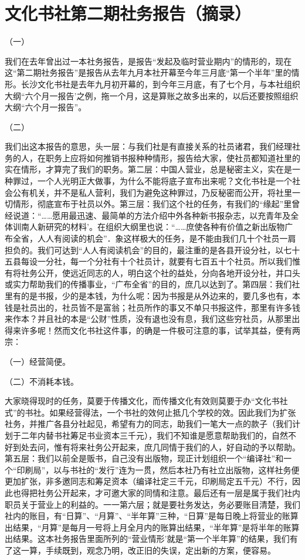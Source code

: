 \section{文化书社第二期社务报告（摘录）}



（一）

我们在去年曾出过一本社务报告，是报告“发起及临时营业期内”的情形的，现在这“第二期社务报告”是报告从去年九月本社开幕至今年三月底“第一个半年”里的情形。长沙文化书社是去年九月初开幕的，到今年三月底，有了七个月，与本社组织大纲“六个月一报告’之例，拖一个月，这是算账之故多出来的，以后还要按照组织大纲“六个月一报告”。

（二）

我们出这本报告的意思，头一层：与我们社是有直接关系的社员诸君，我们经理社务的人，在职务上应将如何推销书报种种情形，报告给大家，使社员都知道社里的实在情形，才算完了我们的职务。第二层：中国人营业，总是秘密主义，实在是一种罪过，一个人光明正大做事，为什么不能将底子宣布出来呢？文化书社是一个社会公有机关，并不是私人营利，我们为避免这种罪过，乃反秘密而公开，将社里一切情形，彻底宣布于社员以外。第三层：我们这个社的任务，有我们的“缘起”里曾经说道：“……愿用最迅速、最简单的方法介绍中外各种新书报杂志，以充青年及全体训南人新研究的材料’。在组织大纲里也说：“……庶使各种有价值之新出版物广布全省，人人有阅读的机会”．象这样极大的任务，是不能由我们几十个社员一肩担负的。我们可达到“人人有阅读机会”的目的，最注重的是各县开设分社，以七十五县每设一分社，每一个分社有十个社员计，就要有七百五十个社员。所以我们惟有将社务公开，使远近同志的人，明白这个社的益处，分向各地开设分社，并口头或实力帮助我们的传播事业，“广布全省”的目的，庶几以达到了。第四层：我们社里有的是书报，少的是本钱，为什么呢：因为书报是从外边来的，要几多也有，本钱是社员出的，社员皆不是富翁；社员所作的事又不单只书报这件，那里有许多钱来作本？并且社的本是“公财”性质，没有退也没有息，我们这些穷社员，从那里出得来许多呢！然而文化书社这件事，的确是一件极可注意的事，试举其益，便有两宗：

（一）经营简便。

（二）不消耗本钱。

大家晓得现时的任务，莫要于传播文化，而传播文化有效则莫要于办“文化书社式”的书社。如果经营得法，一个书社的效何止抵几个学校的效。因此我们为扩张社务，并推广各县分社起见，希望有力的同志，助我们一笔大一点的款子（我们计划于二年内替书社筹足书业资本三千元），我们不知谁是愿意帮助我们的，自然不好到处去问，惟有将来社务公开起来，庶几同情于我们的人，好自动的予以帮助。第五层：我们以前全是贩书，自己没有出版物，现正计划组织一个“编译社”和一个“印刷局”，以与书社的“发行”连为一贯，然后本社乃有社立出版物，这样社务便更加扩张，非多邀同志和筹足资本（编译社定三千元，印刷局定五千元）不行，因此也得把社务公开起来，才可邀大家的同情和注意。最后还有一层是属于我们社内职员关于营业上的利益的。一一第六层；就是要社务发达，务必要账目清楚，我们社内的账目，有“日算”、“月算”、“半年算”三种，“日算”是每日晚上将营业的账算出结果，“月算”是每月一号将上月全月内的账算出结果，“半年算”是将半年的账算出结果。这本社务报告里面所列的“营业情形’就是“第一个半年算”的结果，我们有了这一算，手续既到，观念乃明，改正旧的失误，定出新的方案，便容易。

